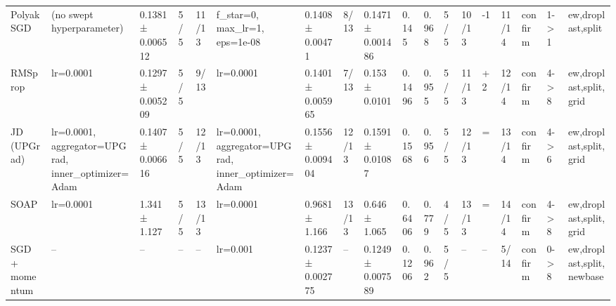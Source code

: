 \begin{tabular}{llllllllllllllllll}
Polyak SGD & (no swept hyperparameter) & 0.1381 ± 0.006512 & 5/5 & 11/13 & f\_star=0, max\_lr=1, eps=1e-08 & 0.1408 ± 0.00471 & 8/13 & 0.1471 ± 0.001486 & 0.145 & 0.968 & 5/5 & 10/13 & -1 & 11/14 & confirm & 1->1 & ew,droplast,split \\
RMSprop & lr=0.0001 & 0.1297 ± 0.005209 & 5/5 & 9/13 & lr=0.0001 & 0.1401 ± 0.005965 & 7/13 & 0.153 ± 0.0101 & 0.1496 & 0.955 & 5/5 & 11/13 & +2 & 12/14 & confirm & 4->8 & ew,droplast,split,grid \\
JD (UPGrad) & lr=0.0001, aggregator=UPGrad, inner\_optimizer=Adam & 0.1407 ± 0.006616 & 5/5 & 12/13 & lr=0.0001, aggregator=UPGrad, inner\_optimizer=Adam & 0.1556 ± 0.009404 & 12/13 & 0.1591 ± 0.01087 & 0.1568 & 0.956 & 5/5 & 12/13 & = & 13/14 & confirm & 4->6 & ew,droplast,split,grid \\
SOAP & lr=0.0001 & 1.341 ± 1.127 & 5/5 & 13/13 & lr=0.0001 & 0.9681 ± 1.166 & 13/13 & 0.646 ± 1.065 & 0.6406 & 0.779 & 4/5 & 13/13 & = & 14/14 & confirm & 4->8 & ew,droplast,split,grid \\
SGD + momentum & -- & -- & -- & -- & lr=0.001 & 0.1237 ± 0.002775 & -- & 0.1249 ± 0.007589 & 0.1206 & 0.962 & 5/5 & -- & -- & 5/14 & confirm & 0->8 & ew,droplast,split,newbase \\
\bottomrule
\end{tabular}
